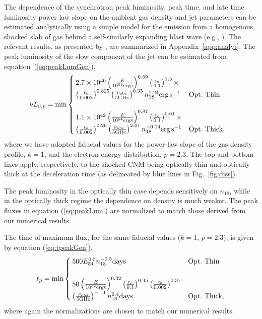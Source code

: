 \documentclass[usenatbib,fleqn]{mnras}
\begin{document}
The dependence of the synchrotron peak luminosity, peak time, and late
time luminosity power law slope on the ambient gas density and jet
parameters can be estimated analytically using a simple model for the
emission from a homogenous, shocked slab of gas behind a
self-similarly expanding blast wave (e.g., \citealt{Sari+98,
  Granot+02}).  The relevant results, as presented by
\citet{Leventis+2012}, are summarized in Appendix~\ref{app:analyt}.
The peak luminosity of the slow component of the jet can be estimated
from equation~(\ref{eq:peakLumGen}),
\begin{align}
\nu L_{\nu, p}&=\text{min}
\begin{cases}
  2.7\times 10^{40} \left(\frac{E}{10^{54} {\rm ergs}}\right)^{0.59}
  \left(\frac{\epsilon_e}{0.1}\right)^{1.3}\times \\
  \left(\frac{\epsilon_b}{0.002}\right)^{0.825}\left(\frac{\nu_{\rm
        obs}}{5 {\rm GHz}}\right)^{0.35} n_{18}^{1.24}
  {\rm erg \, s^{-1}} & {\rm Opt.~Thin}\\\\
  1.1 \times 10^{42} \left(\frac{E}{10^{54} {\rm ergs}}\right)^{0.87}
  \left(\frac{\epsilon_e}{0.1}\right)^{0.61}\times\\
  \left(\frac{\epsilon_b}{0.002}\right)^{0.26}\left(\frac{\nu_{\rm
        obs}}{5 {\rm GHz}}\right)^{2.01} n_{18}^{-0.14} {\rm erg\,
    s^{-1}} & {\rm Opt.~Thick},
\end{cases}
\label{eq:peakLum}
\end{align}
where we have adopted fiducial values for the power-law slope of the
gas density profile, $k=1$, and the electron energy distribution,
$p=2.3$.  The top and bottom lines apply, respectively, to the shocked
CNM being optically thin and optically thick at the deceleration time (as delineated by blue lines in Fig.~\ref{fig:diss}).

The peak luminosity in the optically thin case depends sensitively on
$n_{18}$, while in the optically thick regime the dependence on
density is much weaker.  The peak fluxes in equation
(\ref{eq:peakLum}) are normalized to match those derived from our
numerical results.

The time of maximum flux, for the same fiducial values ($k = 1$,
$p=2.3$), is given by equation (\ref{eq:tpeakGen}),
\begin{align}
t_p= \text{min}
\begin{cases}
  500 E_{54}^{0.5} n_{18}^{-0.5} {\rm days} & {\rm Opt.~Thin}\\\\
  50 \left(\frac{E}{10^{54} {\rm ergs}}\right)^{0.32}
  \left(\frac{\epsilon_e}{0.1}\right)^{0.45}
  \left(\frac{\epsilon_b}{0.002}\right)^{0.37}\\
  \left(\frac{\nu_{\rm obs}}{5 {\rm GHz}}\right)^{-1.1} n_{18}^{0.4}
  {\rm days}& {\rm Opt.~Thick},
\end{cases}
\label{eq:peakTime}
\end{align}
where again the normalizations are chosen to match our numerical
results. 
\end{document}
